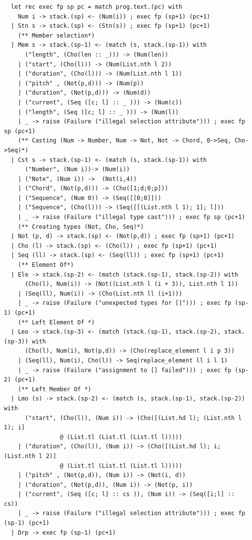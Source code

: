 \documentclass[12pt,A4]{book}
\begin{document}
\begin{verbatim}
  let rec exec fp sp pc = match prog.text.(pc) with
    Num i -> stack.(sp) <- (Num(i)) ; exec fp (sp+1) (pc+1)
  | Stn s -> stack.(sp) <- (Stn(s)) ; exec fp (sp+1) (pc+1)
    (** Member selection*)
  | Mem s -> stack.(sp-1) <- (match (s, stack.(sp-1)) with 
      ("length", (Cho(len :: _))) -> (Num(len))
    | ("start", (Cho(l))) -> (Num(List.nth l 2))
    | ("duration", (Cho(l))) -> (Num(List.nth l 1))
    | ("pitch" , (Not(p,d))) -> (Num(p))
    | ("duration", (Not(p,d))) -> (Num(d))
    | ("current", (Seq ([c; l] :: _ ))) -> (Num(c))
    | ("length", (Seq ([c; l] :: _ ))) -> (Num(l))
    | _ -> raise (Failure ("illegal selection attribute"))) ; exec fp sp (pc+1)
    (** Casting (Num -> Number, Num -> Not, Not -> Chord, 0->Seq, Cho->Seq)*)
  | Cst s -> stack.(sp-1) <- (match (s, stack.(sp-1)) with 
      ("Number", (Num i))-> (Num(i))
    | ("Note", (Num i)) ->  (Not(i,4))
    | ("Chord", (Not(p,d))) -> (Cho([1;d;0;p]))
    | ("Sequence", (Num 0)) -> (Seq([[0;0]]))
    | ("Sequence", (Cho(l))) -> (Seq([[(List.nth l 1); 1]; l]))
    | _ -> raise (Failure ("illegal type cast"))) ; exec fp sp (pc+1)
    (** Creating types (Not, Cho, Seq)*)
  | Not (p, d) -> stack.(sp) <- (Not(p,d)) ; exec fp (sp+1) (pc+1)
  | Cho (l) -> stack.(sp) <- (Cho(l)) ; exec fp (sp+1) (pc+1)
  | Seq (ll) -> stack.(sp) <- (Seq(ll)) ; exec fp (sp+1) (pc+1)
    (** Element Of*)
  | Ele -> stack.(sp-2) <- (match (stack.(sp-1), stack.(sp-2)) with 
      (Cho(l), Num(i)) -> (Not((List.nth l (i + 3)), List.nth l 1))
    | (Seq(ll), Num(i)) -> (Cho(List.nth ll (i+1)))
    | _ -> raise (Failure ("unexpected types for []"))) ; exec fp (sp-1) (pc+1)
    (** Left Element Of *)
  | Leo -> stack.(sp-3) <- (match (stack.(sp-1), stack.(sp-2), stack.(sp-3)) with 
      (Cho(l), Num(i), Not(p,d)) -> (Cho(replace_element l i p 3))
    | (Seq(ll), Num(i), Cho(l)) -> Seq(replace_element ll i l 1)
    | _ -> raise (Failure ("assignment to [] failed"))) ; exec fp (sp-2) (pc+1)
    (** Left Member Of *)
  | Lmo (s) -> stack.(sp-2) <- (match (s, stack.(sp-1), stack.(sp-2)) with 
      ("start", (Cho(l)), (Num i)) -> (Cho([(List.hd l); (List.nth l 1); i] 
                @ (List.tl (List.tl (List.tl l)))))
    | ("duration", (Cho(l)), (Num i)) -> (Cho([(List.hd l); i; (List.nth l 2)] 
                @ (List.tl (List.tl (List.tl l)))))
    | ("pitch" , (Not(p,d)), (Num i)) -> (Not(i, d))
    | ("duration", (Not(p,d)), (Num i)) -> (Not(p, i))
    | ("current", (Seq ([c; l] :: cs )), (Num i)) -> (Seq([i;l] :: cs))
    | _ -> raise (Failure ("illegal selection attribute"))) ; exec fp (sp-1) (pc+1)
  | Drp -> exec fp (sp-1) (pc+1)

\end{verbatim}
\end{document}
